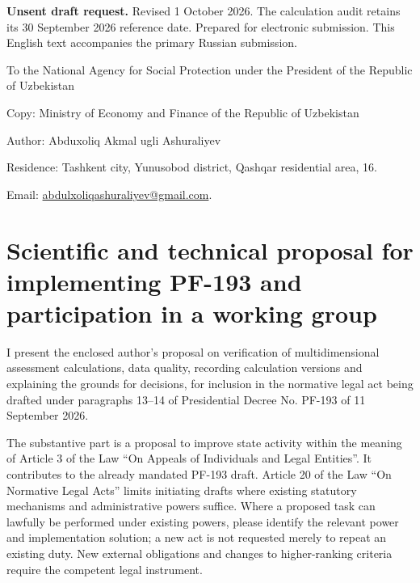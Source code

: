 \documentclass[14pt,a4paper]{extarticle}
\begin{document}
\textbf{Unsent draft request.} Revised 1 October 2026. The calculation audit retains its 30 September 2026 reference date. Prepared for electronic submission. This English text accompanies the primary Russian submission.

To the National Agency for Social Protection under the President of the Republic of Uzbekistan

Copy: Ministry of Economy and Finance of the Republic of Uzbekistan

Author: Abduxoliq Akmal ugli Ashuraliyev

Residence: Tashkent city, Yunusobod district, Qashqar residential area, 16.

Email: \href{mailto:abdulxoliqashuraliyev@gmail.com}{abdulxoliqashuraliyev@gmail.com}.

\section*{Scientific and technical proposal for implementing PF-193 and participation in a working group}
I present the enclosed author’s proposal on verification of multidimensional assessment calculations, data quality, recording calculation versions and explaining the grounds for decisions, for inclusion in the normative legal act being drafted under paragraphs 13–14 of Presidential Decree No. PF-193 of 11 September 2026.

The substantive part is a proposal to improve state activity within the meaning of Article 3 of the Law “On Appeals of Individuals and Legal Entities”. It contributes to the already mandated PF-193 draft. Article 20 of the Law “On Normative Legal Acts” limits initiating drafts where existing statutory mechanisms and administrative powers suffice. Where a proposed task can lawfully be performed under existing powers, please identify the relevant power and implementation solution; a new act is not requested merely to repeat an existing duty. New external obligations and changes to higher-ranking criteria require the competent legal instrument.
\end{document}
